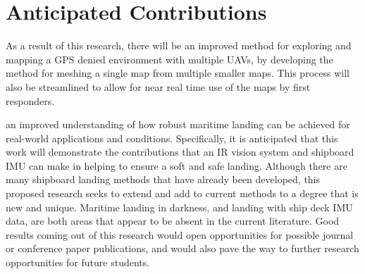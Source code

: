 \documentclass[12pt, letterpaper]{article}
\begin{document}

%

\section{Anticipated Contributions}

As a result of this research, there will be an improved method for exploring and mapping a GPS denied environment with multiple UAVs, by developing the method for meshing a single map from multiple smaller maps. This process will also be streamlined to allow for near real time use of the maps by first responders. 

an improved understanding of how robust maritime landing can be achieved for real-world applications and conditions.  Specifically, it is anticipated that this work will demonstrate the contributions that an IR vision system and shipboard IMU can make in helping to ensure a soft and safe landing. Although there are many shipboard landing methods that have already been developed, this proposed research seeks to extend and add to current methods to a degree that is new and unique.  Maritime landing in darkness, and landing with ship deck IMU data, are both areas that appear to be absent in the current literature. Good results coming out of this research would open opportunities for possible journal or conference paper publications, and would also pave the way to further research opportunities for future students.    
\end{document}
